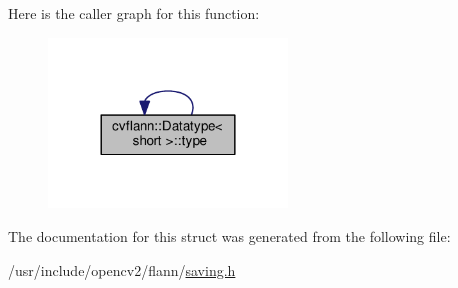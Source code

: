Here is the caller graph for this function\-:\nopagebreak
\begin{figure}[H]
\begin{center}
\leavevmode
\includegraphics[width=180pt]{structcvflann_1_1Datatype_3_01short_01_4_a4661f54f900bfe2f8e1261a1e374f7cc_icgraph}
\end{center}
\end{figure}




The documentation for this struct was generated from the following file\-:\begin{DoxyCompactItemize}
\item 
/usr/include/opencv2/flann/\hyperlink{saving_8h}{saving.\-h}\end{DoxyCompactItemize}
